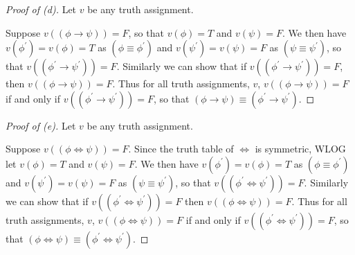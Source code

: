 \documentclass{article}
\theoremstyle{remark}\newtheorem{remark}{Remark}
\theoremstyle{plain}
\begin{document}
\begin{proof}[Proof of (d)]
    Let $v$ be any truth assignment.

    Suppose $v((\phi \to \psi)) = F$, so that $v(\phi) = T$ and $v(\psi) = F$. We then have $v(\phi^{'}) = v(\phi) = T$ as $(\phi \equiv \phi^{'})$ and $v(\psi^{'}) = v(\psi) = F$ as $(\psi \equiv \psi^{'})$, so that $v((\phi^{'} \to \psi^{'})) = F$. Similarly we can show that if $v((\phi^{'} \to \psi^{'})) = F$, then $v((\phi \to \psi)) = F$. Thus for all truth assignments, $v$, $v((\phi \to \psi)) = F$ if and only if $v((\phi^{'} \to \psi^{'})) = F$, so that $(\phi \to \psi) \equiv (\phi^{'} \to \psi^{'})$.
\end{proof}

\begin{proof}[Proof of (e)]
    Let $v$ be any truth assignment.

    Suppose $v((\phi \iff \psi)) = F$. Since the truth table of $\iff$ is symmetric, WLOG let $v(\phi) = T$ and $v(\psi) = F$. We then have $v(\phi^{'}) = v(\phi) = T$ as $(\phi \equiv \phi^{'})$ and $v(\psi^{'}) = v(\psi) = F$ as $(\psi \equiv \psi^{'})$, so that $v((\phi^{'} \iff \psi^{'})) = F$. Similarly we can show that if $v((\phi^{'} \iff \psi^{'})) = F$ then $v((\phi \iff \psi)) = F$. Thus for all truth assignments, $v$, $v((\phi \iff \psi)) = F$ if and only if $v((\phi^{'} \iff \psi^{'})) = F$, so that $(\phi \iff \psi) \equiv (\phi^{'} \iff \psi^{'})$.
\end{proof}
\end{document}
